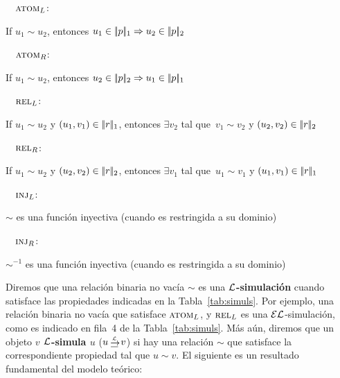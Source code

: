 \newcommand{\simdef}[2]{\noindent\ \ #1\hfill:\ \parbox[t]{.87\textwidth}{#2}\par}

\simdef{$\textsc{atom}_L$}{If $u_1{\sim} u_2$, entonces $u_1 \in |\!|p|\!|_1 \Rightarrow u_2 \in |\!|p|\!|_2$}
\simdef{$\textsc{atom}_R$}{If $u_1{\sim} u_2$, entonces $u_2 \in |\!|p|\!|_2 \Rightarrow u_1 \in |\!|p|\!|_1$}
\simdef{$\textsc{rel}_L$}{If $u_1{\sim} u_2$ y $(u_1,v_1) \in |\!|r|\!|_1$, entonces $\exists v_2$ tal que\ $v_1{\sim}v_2$
  y $(u_2,v_2) \in |\!|r|\!|_2$}
\simdef{$\textsc{rel}_R$}{If $u_1{\sim}u_2$ y $(u_2,v_2) \in |\!|r|\!|_2$, entonces $\exists v_1$ tal que\ $u_1{\sim}v_1$ y
 $(u_1,v_1) \in |\!|r|\!|_1$}
\simdef{$\textsc{inj}_L\space$}{$\sim$ es una funci\'on inyectiva (cuando es restringida a su dominio)}
\simdef{$\textsc{inj}_R\space$}{$\sim^{-1}$ es una funci\'on inyectiva (cuando es restringida a su dominio)}
\smallskip

Diremos que una relaci\'on binaria no vac\'ia $\sim$ es una 
{\bf $\mathcal{L}$-simulaci\'on} cuando satisface las propiedades indicadas
en la Tabla~\ref{tab:simuls}. Por ejemplo, una relaci\'on binaria no vac\'ia que satisface $\textsc{atom}_L$, y $\textsc{rel}_L$ es una $\mathcal{EL}$-simulaci\'on, como es indicado en fila~4 de la Tabla~\ref{tab:simuls}. M\'as a\'un, diremos que un objeto
{\bf $v$ $\mathcal{L}$-simula $u$} ($u \simul{\+L} v$) si hay una relaci\'on $\sim$ que satisface la correspondiente propiedad tal que
$u \sim v$. El siguiente es un resultado fundamental del modelo te\'orico:%

